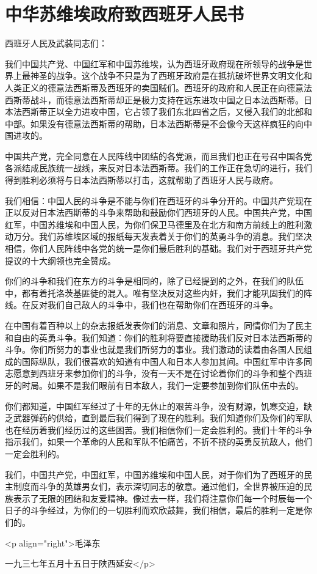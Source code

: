\section[中华苏维埃政府致西班牙人民书（一九三七年五月十五日）]{中华苏维埃政府致西班牙人民书}


西班牙人民及武装同志们：

我们中国共产党、中国红军和中国苏维埃，认为西班牙政府现在所领导的战争是世界上最神圣的战争。这个战争不只是为了西班牙政府是在抵抗破坏世界文明文化和人类正义的德意法西斯蒂及西班牙的卖国贼们。西班牙的政府和人民正在向德意法西斯蒂战斗，而德意法西斯蒂却正是极力支持在远东进攻中国之日本法西斯蒂。日本法西斯蒂正以全力进攻中国，它占领了我们东北四省之后，又侵入我们的北部和中部。如果没有德意法西斯蒂的帮助，日本法西斯蒂是不会像今天这样疯狂的向中国进攻的。

中国共产党，完全同意在人民阵线中团结的各党派，而且我们也正在号召中国各党各派结成民族统一战线，来反对日本法西斯蒂。我们的工作正在急切的进行，我们得到胜利必须将与日本法西斯蒂以打击，这就帮助了西班牙人民与政府。

我们相信：中国人民的斗争是不能与你们在西班牙的斗争分开的。中国共产党现在正以反对日本法西斯蒂的斗争来帮助和鼓励你们西班牙的人民。中国共产党，中国红军，中国苏维埃和中国人民，为你们保卫马德里及在北方和南方前线上的胜利激动万分。我们苏维埃区域的报纸每天发表着关于你们的英勇斗争的消息。我们坚决相信，你们人民阵线中各党的统一是你们最后胜利的基础。我们对于西班牙共产党提议的十大纲领也完全赞成。

你们的斗争和我们在东方的斗争是相同的，除了已经提到的之外，在我们的队伍中，都有着托洛茨基匪徒的混入。唯有坚决反对这些内奸，我们才能巩固我们的阵线。在反对我们自己敌人的斗争中，我们也在帮助你们在西班牙的斗争。

在中国有着百种以上的杂志报纸发表你们的消息、文章和照片，同情你们为了民主和自由的英勇斗争。我们知道：你们的胜利将要直接援助我们反对日本法西斯蒂的斗争。你们所努力的事业也就是我们所努力的事业。我们激动的读着由各国人民组成的国际纵队，我们很喜欢的知道有中国人和日本人参加其间。中国红军中许多同志愿意到西班牙来参加你们的斗争，没有一天不是在讨论着你们的斗争和整个西班牙的时局。如果不是我们眼前有日本敌人，我们一定要参加到你们队伍中去的。

你们都知道，中国红军经过了十年的无休止的艰苦斗争，没有财源，饥寒交迫，缺乏武器弹药的供给，直到最后我们得到了现在的胜利。我们知道你们及你们的军队也在经历着我们经历过的这些困苦。我们相信你们一定会胜利的。我们十年的斗争指示我们，如果一个革命的人民和军队不怕痛苦，不折不挠的英勇反抗敌人，他们一定会胜利的。

我们，中国共产党，中国红军，中国苏维埃和中国人民，对于你们为了西班牙的民主制度而斗争的英雄男女们，表示深切同志的敬意。通过他们，全世界被压迫的民族表示了无限的团结和友爱精神。像过去一样，我们将注意你们每一个时辰每一个日子的斗争经过，为你们的一切胜利而欢欣鼓舞，我们相信，最后的胜利一定是你们的。

<p align="right">毛泽东

一九三七年五月十五日于陕西延安</p>

